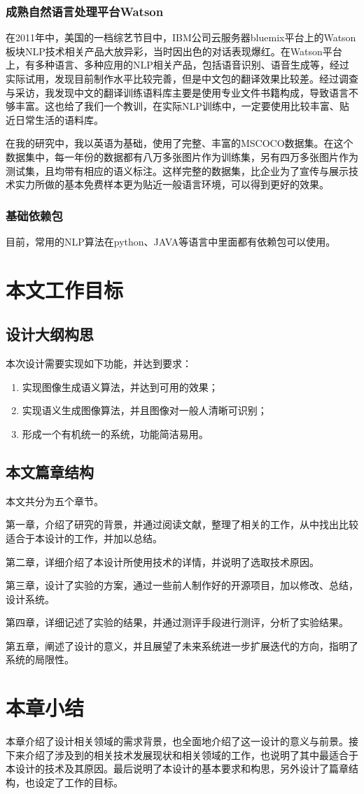 \subsubsection{成熟自然语言处理平台Watson}
在2011年中，美国的一档综艺节目中，IBM公司云服务器bluemix平台上的Watson板块NLP技术相关产品大放异彩，当时因出色的对话表现爆红。在Watson平台上，有多种语言、多种应用的NLP相关产品，包括语音识别、语音生成等，经过实际试用，发现目前制作水平比较完善，但是中文包的翻译效果比较差。经过调查与采访，我发现中文的翻译训练语料库主要是使用专业文件书籍构成，导致语言不够丰富。这也给了我们一个教训，在实际NLP训练中，一定要使用比较丰富、贴近日常生活的语料库。

在我的研究中，我以英语为基础，使用了完整、丰富的MSCOCO数据集。在这个数据集中，每一年份的数据都有八万多张图片作为训练集，另有四万多张图片作为测试集，且均带有相应的语义标注。这样完整的数据集，比企业为了宣传与展示技术实力所做的基本免费样本更为贴近一般语言环境，可以得到更好的效果。

\subsubsection{基础依赖包}
目前，常用的NLP算法在python、JAVA等语言中里面都有依赖包可以使用。

\section{本文工作目标}

\subsection{设计大纲构思}
本次设计需要实现如下功能，并达到要求：
\begin{enumerate}[fullwidth,itemindent=2em,label=\arabic*.]
    \item 实现图像生成语义算法，并达到可用的效果；
    \item 实现语义生成图像算法，并且图像对一般人清晰可识别；
    \item 形成一个有机统一的系统，功能简洁易用。
\end{enumerate}

\subsection{本文篇章结构}

本文共分为五个章节。

第一章，介绍了研究的背景，并通过阅读文献，整理了相关的工作，从中找出比较适合于本设计的工作，并加以总结。

第二章，详细介绍了本设计所使用技术的详情，并说明了选取技术原因。

第三章，设计了实验的方案，通过一些前人制作好的开源项目，加以修改、总结，设计系统。

第四章，详细记述了实验的结果，并通过测评手段进行测评，分析了实验结果。

第五章，阐述了设计的意义，并且展望了未来系统进一步扩展迭代的方向，指明了系统的局限性。

\section{本章小结}
本章介绍了设计相关领域的需求背景，也全面地介绍了这一设计的意义与前景。接下来介绍了涉及到的相关技术发展现状和相关领域的工作，也说明了其中最适合于本设计的技术及其原因。最后说明了本设计的基本要求和构思，另外设计了篇章结构，也设定了工作的目标。